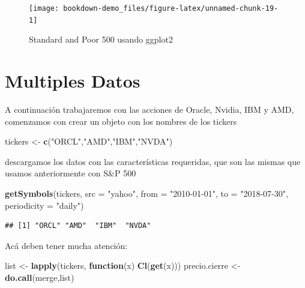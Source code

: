 \documentclass[12pt,]{book}
\newenvironment{Shaded}{\begin{snugshade}}{\end{snugshade}}
\newcommand{\KeywordTok}[1]{\textcolor[rgb]{0.13,0.29,0.53}{\textbf{#1}}}
\newcommand{\DataTypeTok}[1]{\textcolor[rgb]{0.13,0.29,0.53}{#1}}
\newcommand{\StringTok}[1]{\textcolor[rgb]{0.31,0.60,0.02}{#1}}
\newcommand{\ControlFlowTok}[1]{\textcolor[rgb]{0.13,0.29,0.53}{\textbf{#1}}}
\newcommand{\NormalTok}[1]{#1}
\begin{document}
\begin{figure}

{\centering \texttt{[image: bookdown-demo\_files/figure-latex/unnamed-chunk-19-1]} 

}

\caption{Standard and Poor 500 usando ggplot2}\label{fig:unnamed-chunk-19}
\end{figure}

\section{Multiples Datos}\label{multiples-datos}

A continuación trabajaremos con las acciones de Oracle, Nvidia, IBM y
AMD, comenzamos con crear un objeto con los nombres de los tickers

\begin{Shaded}
\begin{Highlighting}[]
\NormalTok{tickers <-}\StringTok{ }\KeywordTok{c}\NormalTok{(}\StringTok{"ORCL"}\NormalTok{,}\StringTok{"AMD"}\NormalTok{,}\StringTok{"IBM"}\NormalTok{,}\StringTok{"NVDA"}\NormalTok{)}
\end{Highlighting}
\end{Shaded}

descargamos los datos con las características requeridas, que son las
mismas que usamos anteriormente con S\&P 500

\begin{Shaded}
\begin{Highlighting}[]
\KeywordTok{getSymbols}\NormalTok{(tickers, }\DataTypeTok{src =} \StringTok{"yahoo"}\NormalTok{, }\DataTypeTok{from =} \StringTok{"2010-01-01"}\NormalTok{, }\DataTypeTok{to =} \StringTok{"2018-07-30"}\NormalTok{, }\DataTypeTok{periodicity =} \StringTok{"daily"}\NormalTok{)}
\end{Highlighting}
\end{Shaded}

\begin{verbatim}
## [1] "ORCL" "AMD"  "IBM"  "NVDA"
\end{verbatim}

Acá deben tener mucha atención:

\begin{Shaded}
\begin{Highlighting}[]
\NormalTok{list <-}\StringTok{ }\KeywordTok{lapply}\NormalTok{(tickers, }\ControlFlowTok{function}\NormalTok{(x) }\KeywordTok{Cl}\NormalTok{(}\KeywordTok{get}\NormalTok{(x)))}
\NormalTok{precio.cierre <-}\StringTok{ }\KeywordTok{do.call}\NormalTok{(merge,list)}
\end{Highlighting}
\end{Shaded}
\end{document}
